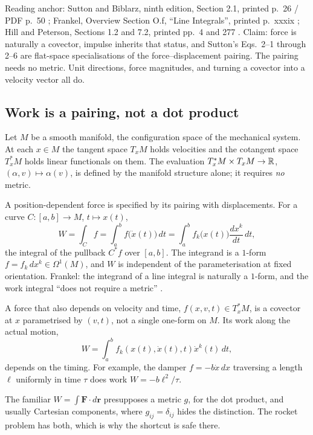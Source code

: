 
Reading anchor: Sutton and Biblarz, ninth edition, Section 2.1, printed
p.~26 / PDF p.~50 \cite{sutton}; Frankel, Overview Section O.f, ``Line
Integrals'', printed p.~xxxix \cite{frankel}; Hill and Peterson, Sections 1.2
and 7.2, printed pp.~4 and 277 \cite{hillpeterson}. Claim: force is naturally
a covector, impulse inherits that status, and Sutton's Eqs.~2--1 through
2--6 are flat-space specialisations of the force--displacement pairing. The
pairing needs no metric. Unit directions, force magnitudes, and turning a
covector into a velocity vector all do.

\subsection{Work is a pairing, not a dot product}
Let $M$ be a smooth manifold, the configuration space of the mechanical
system. At each $x\in M$ the tangent space $T_xM$ holds velocities and the
cotangent space $T^*_xM$ holds linear functionals on them. The evaluation
$T^*_xM\times T_xM\to\mathbb{R}$, $(\alpha,v)\mapsto\alpha(v)$, is defined by the
manifold structure alone; it requires \emph{no} metric.

A position-dependent force is specified by its pairing with displacements.
For a curve $C:[a,b]\to M$, $t\mapsto x(t)$,
\[
 W=\int_C f=\int_a^b f\bigl(\dot x(t)\bigr)\,dt
  =\int_a^b f_k\bigl(x(t)\bigr)\frac{dx^k}{dt}\,dt ,
\]
the integral of the pullback $C^*f$ over $[a,b]$. The integrand is a
$1$-form $f=f_k\,dx^k\in\Omega^1(M)$, and $W$ is independent of the
parameterisation at fixed orientation. Frankel: the integrand of a line
integral is naturally a $1$-form, and the work integral ``does not require a
metric'' \cite[Section O.f]{frankel}.

A force that also depends on velocity and time, $f(x,v,t)\in T_x^*M$, is a
covector at $x$ parametrised by $(v,t)$, not a single one-form on $M$. Its
work along the actual motion,
\begin{equation}\label{Eq:VelocityDependentForceWork}
 W=\int_a^b f_k(x(t),\dot x(t),t)\dot x^k(t)\,dt,
\end{equation}
depends on the timing. For example, the damper $f=-b\dot x\,dx$ traversing
a length $\ell$ uniformly in time $\tau$ does work $W=-b\ell^2/\tau$.

The familiar $W=\int\mathbf F\cdot d\mathbf r$ presupposes a metric $g$, for
the dot product, and usually Cartesian components, where $g_{ij}=\delta_{ij}$
hides the distinction. The rocket problem has both, which is why the
shortcut is safe there.

